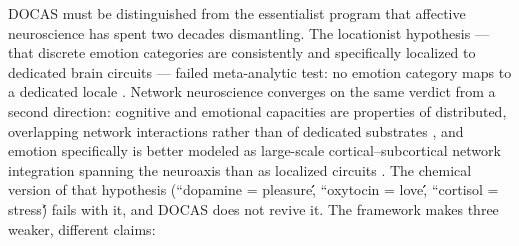 \documentclass[11pt,twocolumn]{article}
\theoremstyle{plain}
\begin{document}
DOCAS must be distinguished from the essentialist program that affective neuroscience has spent two decades dismantling. The locationist hypothesis — that discrete emotion categories are consistently and specifically localized to dedicated brain circuits — failed meta-analytic test: no emotion category maps to a dedicated locale \citep{lindquist2012}. Network neuroscience converges on the same verdict from a second direction: cognitive and emotional capacities are properties of distributed, overlapping network interactions rather than of dedicated substrates \citep{bassett2017}, and emotion specifically is better modeled as large-scale cortical–subcortical network integration spanning the neuroaxis than as localized circuits \citep{pessoa2017}. The chemical version of that hypothesis (``dopamine = pleasure\'\', ``oxytocin = love\'\', ``cortisol = stress\'\') fails with it, and DOCAS does not revive it. The framework makes three weaker, different claims:
\end{document}
